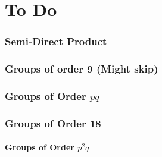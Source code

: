 \documentclass[a4paper, oneside, 12pt, final]{article}
\newtheorem{theorem}{Theorem}[section]
\theoremstyle{definition}
\newtheorem{definition}[theorem]{Definition}
\DeclareMathOperator{\Aut}{Aut}
\begin{document}

\part{To Do}

\section{Semi-Direct Product}
%
%
%
%

\section{Groups of order 9 (Might skip)}


\section{Groups of Order \(pq\)}

\section{Groups of Order 18}
\subsection{Groups of Order \(p^2q\)}
\end{document}
